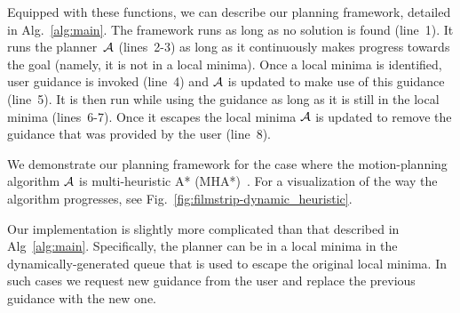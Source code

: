 \documentclass[conference]{IEEEtran}
\begin{document}
Equipped with these functions, we can describe our planning framework, detailed in Alg.~\ref{alg:main}.
The framework runs as long as no solution is found (line~1).
It runs the planner~$\mathcal{A}$ (lines~2-3) as long as it continuously makes progress towards the goal (namely, it is not in a local minima).
Once a local minima is identified, user guidance is invoked (line~4) and $\mathcal{A}$  is updated to make use of this guidance (line~5).
It is then run while using the guidance as long as it is still in the local minima (lines~6-7).
Once it escapes the local minima $\mathcal{A}$ is updated to remove the guidance that was provided by the user (line~8).


We demonstrate our planning framework for the case where the motion-planning algorithm $\mathcal{A}$ is multi-heuristic A* (MHA*)~\cite{ASNHL16}.
For a visualization of the way the algorithm progresses, see Fig.~\ref{fig:filmstrip-dynamic_heuristic}.

Our implementation is slightly more complicated than that described in Alg~\ref{alg:main}.
Specifically, the planner can be in a local minima in the dynamically-generated queue that is used to escape the original local minima. 
In such cases we request new guidance from the user and replace the previous guidance with the new one.
\end{document}
